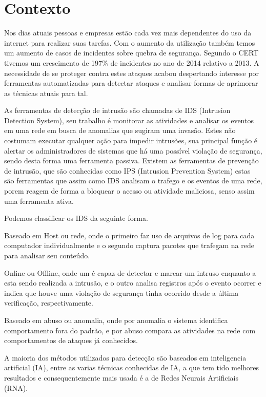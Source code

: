 \documentclass[
	12pt,				%
	openright,			%
	oneside,
	a4paper,			%
	english,			%
	french,				%
	spanish,			%
	brazil				%
	]{abntex2}
\begin{document}
\section{Contexto}

Nos dias atuais pessoas e empresas estão cada vez mais dependentes do uso da internet para realizar suas tarefas. Com o aumento da utilização também temos um aumento de casos de incidentes sobre quebra de segurança. Segundo o CERT \cite{CERT} tivemos um crescimento de 197\% de incidentes no ano de 2014 relativo a 2013. A necessidade de se proteger contra estes
ataques acabou despertando interesse por ferramentas automatizadas para detectar ataques e analisar formas de aprimorar as técnicas atuais para tal.

As ferramentas de detecção de intrusão são chamadas de IDS (Intrusion Detection System), seu trabalho é monitorar as atividades e analisar os eventos em uma rede em busca de anomalias que sugiram uma invasão. Estes não costumam executar qualquer ação para impedir intrusões, sua principal função é alertar os administradores de sistemas que há uma possível violação de segurança, sendo desta forma uma ferramenta passiva.
Existem as ferramentas de prevenção de intrusão, que são conhecidas como IPS (Intrusion Prevention System) estas são ferramentas que assim como IDS analisam o trafego e os eventos de uma rede, porem reagem de forma a bloquear o acesso ou atividade maliciosa, senso assim uma ferramenta ativa.

Podemos classificar os IDS da seguinte forma.

Baseado em Host ou rede, onde o primeiro faz uso de arquivos de log para cada computador individualmente e o segundo captura pacotes que trafegam na rede para analisar seu conteúdo.

Online ou Offline, onde um é capaz de detectar e marcar um intruso enquanto a esta sendo realizada a intrusão, e o outro analisa registros após o evento ocorrer e indica que houve uma violação de segurança tinha ocorrido desde a última verificação, respectivamente.

Baseado em abuso ou anomalia, onde por anomalia o sistema identifica comportamento fora do padrão, e por abuso compara as atividades na rede com comportamentos de ataques já conhecidos.

A maioria dos métodos utilizados para detecção são baseados em inteligencia artificial (IA), entre as varias técnicas conhecidas de IA, a que tem tido melhores resultados e consequentemente mais usada é a de Redes Neurais Artificiais (RNA)\cite{Jake-Ryan}\cite{Stampar}.
\end{document}
